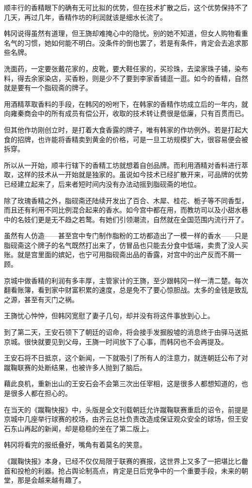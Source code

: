 顺丰行的香精眼下的确有无可比拟的优势，但在技术扩散之后，这个优势保持不了几天，再过几年，香精作坊的利润就该是细水长流了。

韩冈说得虽然有道理，但王旖却难掩心中的隐忧。别的她不知道，但女人购物看重名气的习惯，她如何能不明白。没条件的倒也罢了，若是有条件，肯定会去追求那些名牌。

洗面药，一定要张戴花家的，皮靴，要大鞋任家的，买珍珠，去梁家珠子铺，染布料，得去余家染店，买香粉，则是少不了要到李家香铺逛一逛。如今的香精，自然就是要有一个脂砚斋的牌子。

用酒精萃取香料的手段，在韩冈的吩咐下，在韩家的香精作坊成立后的一年内，就向雍秦商会中的所有成员有偿公开，收取的技术转让费很是低廉，只有百贯而已。

但其他作坊刚创立时，是打着大食香露的牌子，唯有韩家的作坊例外。若是打起大食的招牌，也许能将香精卖到黄金的价格，可是一旦工坊规模扩大，很容易便会被拆穿。

所以从一开始，顺丰行辖下的香精工坊就想着自创品牌。而利用酒精对香料进行萃取，这样的技术从一开始就是独家的。虽说如今技术已经扩散开来，可品牌的优势已经建立起来了，后来者短时间内没有办法动摇到脂砚斋的地位。

除了玫瑰香精之外，脂砚斋还陆续开发出了百合、木犀、桂花、栀子等不同香型，而且还有利用不同比例混合起来的香水。如今宫中都在用，而教坊司以及小甜水巷中的名妓们更是无不趋之若鹜。有她们引领潮流，自然就在全国范围内流行开了。

虽然有人仿造——甚至宫中专门制作脂粉的工坊都造出了一模一样的香水——只是脂砚斋这个牌子的名气既然打出来了，仿冒品也只能去分食中低端，卖贵了没人买账。就是宫里面的嫔妃，也宁可用脂砚斋出品的香露，对宫中的出产反而不屑一顾。

京城中做香精的利润有多丰厚，主管家计的王旖，至少跟韩冈一样一清二楚。每次翻看账簿，看到家中财富积累的速度，总是免不了要心惊胆战。太多的金钱是致乱之源，甚至有灭门之祸。

王旖忧心忡忡，但韩冈宽慰了妻子几句，却并没有将这件事放到心上。

到了第二天，王安石领下了朝廷的诏命，将会接手发掘殷墟的消息终于由驿马送抵京城。很快就要见到父母，王旖一时间放下了心事，而韩冈也不会再提及。

王安石将不日抵京，这个新闻，一下就吸引了所有人的注意力，就连朝廷公布了对蹴鞠联赛的处断结果，也被许多人抛到了脑后。

藉此良机，重新出山的王安石会不会第三次出任宰相，这是很多人都想知道的，也是很多人都在担心的。

在当天的《蹴鞠快报》中，头版是全文刊载朝廷允许蹴鞠联赛重启的诏令，前提是京城中几座举行球赛的校场，由齐云总社负责改造成保证观众安全的球场，但王安石东山再起的新闻，却是稳稳的坐在了第二版上。

韩冈将看完的报纸叠好，嘴角有着莫名的笑意。

《蹴鞠快报》本身，已经不仅仅局限于联赛的赛报，这世界上又多了一把堪比匕齤首和投枪的利器。抢占舆论制高点，肯定是日后党争中的一个重要手段，未来的朝堂，那是会越来越有趣了。

